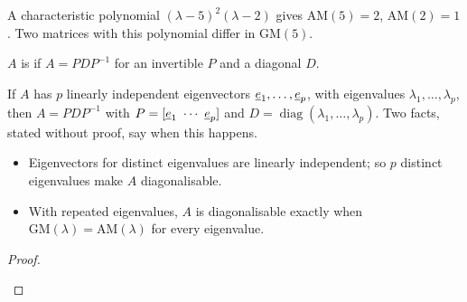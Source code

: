 \begin{example}[Multiplicities]
A characteristic polynomial $(\lambda-5)^2(\lambda-2)$ gives $\text{AM}(5)=2$, $\text{AM}(2)=1$. Two matrices with this polynomial differ in $\text{GM}(5)$.
\begin{deriv}
\end{deriv}
\end{example}

\begin{definition}[Diagonalisable]
$A$ is  if $\boxed{A=PDP^{-1}}$ for an invertible $P$ and a diagonal $D$.
\end{definition}

\begin{result}
If $A$ has $p$ linearly independent eigenvectors $\underline{e}_1,\dots,\underline{e}_p$, with eigenvalues $\lambda_1,\dots,\lambda_p$, then $A=PDP^{-1}$ with $P=[\vect{e}_1\ \cdots\ \vect{e}_p]$ and $D=\operatorname{diag}(\lambda_1,\dots,\lambda_p)$. Two facts, stated without proof, say when this happens.
\begin{itemize}
  \item Eigenvectors for distinct eigenvalues are linearly independent; so $p$ distinct eigenvalues make $A$ diagonalisable.
  \item With repeated eigenvalues, $A$ is diagonalisable exactly when $\text{GM}(\lambda)=\text{AM}(\lambda)$ for every eigenvalue.
\end{itemize}
\end{result}
\begin{proof}
\begin{deriv}
\end{deriv}
\end{proof}

